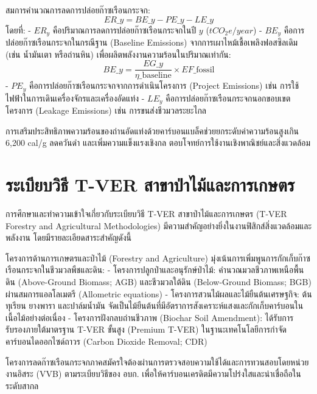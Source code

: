 สมการคำนวณการลดการปล่อยก๊าซเรือนกระจก:
\[ ER\_y = BE\_y - PE\_y - LE\_y \]
โดยที่:
- $ER_y$ คือปริมาณการลดการปล่อยก๊าซเรือนกระจกในปี $y$ ($tCO_2e/year$)
- $BE_y$ คือการปล่อยก๊าซเรือนกระจกในกรณีฐาน (Baseline Emissions) จากการเผาไหม้เชื้อเพลิงฟอสซิลเดิม (เช่น น้ำมันเตา หรือถ่านหิน) เพื่อผลิตพลังงานความร้อนในปริมาณเท่ากัน:
\[ BE\_y = \frac{EG\_y}{\eta\_{\text{baseline}}} \times EF\_{\text{fossil}} \]
- $PE_y$ คือการปล่อยก๊าซเรือนกระจกจากการดำเนินโครงการ (Project Emissions) เช่น การใช้ไฟฟ้าในการเดินเครื่องจักรและเครื่องอัดแท่ง
- $LE_y$ คือการปล่อยก๊าซเรือนกระจกนอกขอบเขตโครงการ (Leakage Emissions) เช่น การขนส่งชีวมวลระยะไกล

\begin{flamebox}
การเสริมประสิทธิภาพความร้อนของถ่านอัดแท่งด้วยคาร์บอนแบล็คช่วยยกระดับค่าความร้อนสูงเกิน 6,200 cal/g ลดควันดำ และเพิ่มความแข็งแรงเชิงกล ตอบโจทย์การใช้งานเชิงพาณิชย์และสิ่งแวดล้อม
\end{flamebox}

\section{ระเบียบวิธี T-VER สาขาป่าไม้และการเกษตร}

การศึกษาและทำความเข้าใจเกี่ยวกับระเบียบวิธี T-VER สาขาป่าไม้และการเกษตร (T-VER Forestry and Agricultural Methodologies) มีความสำคัญอย่างยิ่งในงานฟิสิกส์สิ่งแวดล้อมและพลังงาน โดยมีรายละเอียดสาระสำคัญดังนี้

โครงการด้านการเกษตรและป่าไม้ (Forestry and Agriculture) มุ่งเน้นการเพิ่มพูนการกักเก็บก๊าซเรือนกระจกในชีวมวลพืชและดิน:
- โครงการปลูกป่าและอนุรักษ์ป่าไม้: คำนวณมวลชีวภาพเหนือพื้นดิน (Above-Ground Biomass; AGB) และชีวมวลใต้ดิน (Below-Ground Biomass; BGB) ผ่านสมการแอลโลเมตรี (Allometric equations)
- โครงการสวนไม้ผลและไม้ยืนต้นเศรษฐกิจ: ต้นทุเรียน ยางพารา และปาล์มน้ำมัน จัดเป็นไม้ยืนต้นที่มีอัตราการสังเคราะห์แสงและกักเก็บคาร์บอนในเนื้อไม้อย่างต่อเนื่อง
- โครงการฝังกลบถ่านชีวภาพ (Biochar Soil Amendment): ได้รับการรับรองภายใต้มาตรฐาน T-VER ขั้นสูง (Premium T-VER) ในฐานะเทคโนโลยีการกำจัดคาร์บอนไดออกไซด์ถาวร (Carbon Dioxide Removal; CDR)

\begin{casebox}
โครงการลดก๊าซเรือนกระจกภาคสมัครใจต้องผ่านการตรวจสอบความใช้ได้และการทวนสอบโดยหน่วยงานอิสระ (VVB) ตามระเบียบวิธีของ อบก. เพื่อให้คาร์บอนเครดิตมีความโปร่งใสและน่าเชื่อถือในระดับสากล
\end{casebox}

